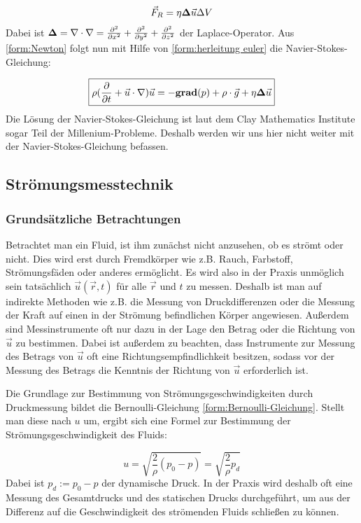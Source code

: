 \begin{equation}
\vec{F}_R = \eta {\bf \Delta} \vec{u} \Delta V
\end{equation}
Dabei ist $ {\bf \Delta} = \nabla \cdot \nabla = \frac{\partial^2}{\partial x^2} + \frac{\partial^2}{\partial y^2} + \frac{\partial^2}{\partial z^2} $ der Laplace-Operator. Aus \ref{form:Newton} folgt nun mit Hilfe von \ref{form:herleitung euler} die Navier-Stokes-Gleichung:

\begin{equation}
\boxed{\rho (\frac{\partial}{\partial t} + \vec{u} \cdot \nabla ) \vec{u} = - {\bf grad}(p) + \rho \cdot \vec{g} + \eta {\bf \Delta} \vec{u}}
\end{equation}
Die Lösung der Navier-Stokes-Gleichung ist laut dem Clay Mathematics Institute sogar Teil der Millenium-Probleme. Deshalb werden wir uns hier nicht weiter mit der Navier-Stokes-Gleichung befassen.

\subsection{Strömungsmesstechnik}
\subsubsection{Grundsätzliche Betrachtungen}
Betrachtet man ein Fluid, ist ihm zunächst nicht anzusehen, ob es strömt oder nicht. Dies wird erst durch Fremdkörper wie z.B. Rauch, Farbstoff, Strömungsfäden oder anderes ermöglicht. Es wird also in der Praxis unmöglich sein tatsächlich $ \vec{u} ( \vec{r} , t) $ für alle $ \vec{r} $ und $t$ zu messen. Deshalb ist man auf indirekte Methoden wie z.B. die  Messung von Druckdifferenzen oder die Messung der Kraft auf einen in der Strömung befindlichen Körper angewiesen. Außerdem sind Messinstrumente oft nur dazu in der Lage den Betrag oder die Richtung von $ \vec{u} $ zu bestimmen. Dabei ist außerdem zu beachten, dass Instrumente zur Messung des Betrags von $ \vec{u} $ oft eine Richtungsempfindlichkeit besitzen, sodass vor der Messung des Betrags die Kenntnis der Richtung von $ \vec{u} $ erforderlich ist.

Die Grundlage zur Bestimmung von Strömungsgeschwindigkeiten durch Druckmessung bildet die Bernoulli-Gleichung \ref{form:Bernoulli-Gleichung}. Stellt man diese nach $u$ um, ergibt sich eine Formel zur Bestimmung der Strömungsgeschwindigkeit des Fluids:

\begin{equation}
\boxed{u = \sqrt{\frac{2}{\rho} (p_0 - p)} = \sqrt{\frac{2}{\rho} p_d}}
\end{equation} 
Dabei ist $ p_d := p_0 - p $ der dynamische Druck. In der Praxis wird deshalb oft eine Messung des Gesamtdrucks und des statischen Drucks durchgeführt, um aus der Differenz auf die Geschwindigkeit des strömenden Fluids schließen zu können.


